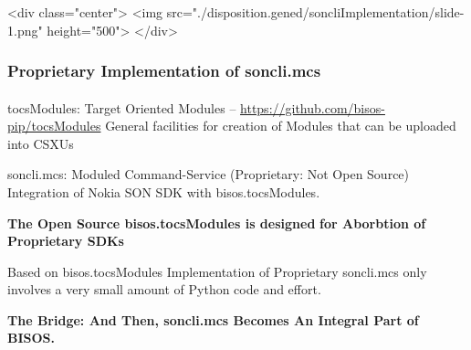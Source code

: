 \begin{htmlonly}

\begin{frame}[fragile,plain,label=soncliImplementation]
    \frametitle{}
    \framesubtitle{}
    \begin{rawhtml}
<div class="center">
<img src="./disposition.gened/soncliImplementation/slide-1.png" height="500">
</div>
    \end{rawhtml}
\end{frame}
\end{htmlonly}

\begin{verblatex}

\begin{frame}[fragile,plain,label=soncliImplementation]
    \frametitle{Proprietary Implementation of soncli.mcs}
    \framesubtitle{}


    \begin{exampleblock}{\small{tocsModules: Target Oriented Modules -- \url{https://github.com/bisos-pip/tocsModules}}}
    \small{General facilities for creation of Modules that can be uploaded into CSXUs}
    \end{exampleblock}

    \bigskip

    \begin{alertblock}{soncli.mcs: Moduled Command-Service  (Proprietary: Not Open Source)}
    \small{Integration of Nokia SON SDK with bisos.tocsModules.}
    \end{alertblock}

      \begin{center}
        \colorbox{blue!30}{\color{black}
          \textbf{The Open Source bisos.tocsModules is designed}}
        \colorbox{blue!30}{\color{black}
          \textbf{for Aborbtion of Proprietary SDKs}}
      \end{center}

      Based on bisos.tocsModules Implementation of Proprietary soncli.mcs only involves
      a very small amount of Python code and effort.


   \begin{center}
      \colorbox{blue!60}{\color{white} \textbf{The Bridge: And Then, soncli.mcs Becomes An Integral Part of BISOS.}}
    \end{center}


\end{frame}
\end{verblatex}
